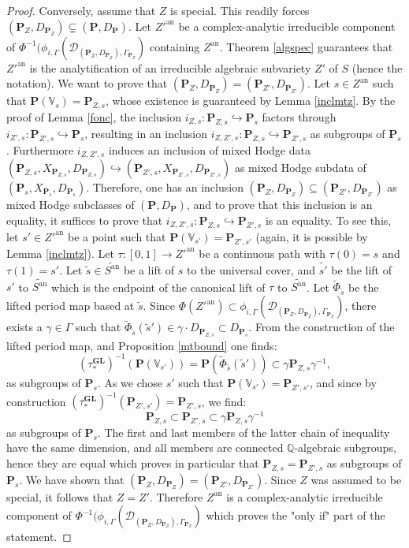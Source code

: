 \documentclass[10pt]{article}
\numberwithin{equation}{subsection}
\theoremstyle{plain}
\theoremstyle{definition}
\theoremstyle{remark}
\newcommand{\Q}{\mathbb Q}
\newcommand{\V}{\mathbb V}
\newcommand{\pp}{\mathbf P}
\newcommand{\an}{\mathrm{an}}
\newcommand{\gl}{\mathbf{GL}}
\newcommand{\period}{\mathscr{D}}
\begin{document}
\begin{proof}
Conversely, assume that $Z$ is special. This readily forces $(\pp_Z, D_{\pp_Z}) \subsetneq (\pp, D_\pp)$. Let $Z'^\an$ be a complex-analytic irreducible component of $\Phi^{-1}(\phi_{i, \Gamma}(\period_{(\pp_Z, D_{\pp_Z}), \Gamma_{\pp_Z}})$ containing $Z^\an$. Theorem \ref{algspec} guarantees that $Z'^\an$ is the analytification of an irreducible algebraic subvariety $Z'$ of $S$ (hence the notation). We want to prove that $(\pp_Z , D_{\pp_Z}) = (\pp_{Z'}, D_{\pp_{Z'}})$. Let $s \in Z^\an$ such that $\pp(\V_s) = \pp_{Z,s}$, whose existence is guaranteed by Lemma \ref{inclmtz}. By the proof of Lemma \ref{fonc}, the inclusion $i_{Z,s} : \pp_{Z,s} \hookrightarrow \pp_s$ factors through $i_{Z',s} : \pp_{Z',s} \hookrightarrow \pp_s$, resulting in an inclusion $i_{Z,Z',s} : \pp_{Z,s} \hookrightarrow \pp_{Z',s}$ as subgroups of $\pp_s$. Furthermore $i_{Z,Z',s}$ induces an inclusion of mixed Hodge data $(\pp_{Z,s}, X_{\pp_{Z,s}}, D_{\pp_{Z,s}}) \hookrightarrow (\pp_{Z',s}, X_{\pp_{Z',s}}, D_{\pp_{Z',s}})$ as mixed Hodge subdata of $(\pp_s, X_{\pp_s}, D_{\pp_s})$. Therefore, one has an inclusion $(\pp_Z, D_{\pp_Z}) \subseteq (\pp_{Z'}, D_{\pp_{Z'}})$ as mixed Hodge subclasses of $(\pp, D_\pp)$, and to prove that this inclusion is an equality, it suffices to prove that $i_{Z,Z',s} : \pp_{Z,s} \hookrightarrow \pp_{Z',s}$ is an equality. To see this, let $s' \in Z'^\an$ be a point such that $\pp(\V_{s'}) = \pp_{Z',s'}$ (again, it is possible by Lemma \ref{inclmtz}). Let $\tau : [0,1] \rightarrow Z'^\an$ be a continuous path with $\tau(0) = s$ and $\tau(1) = s'$. Let $\tilde{s} \in \widetilde{S^\an}$ be a lift of $s$ to the universal cover, and $\tilde{s'}$ be the lift of $s'$ to $\widetilde{S^\an}$ which is the endpoint of the canonical lift of $\tau$ to $\widetilde{S^\an}$. Let $\tilde{\Phi}_{\tilde{s}}$ be the lifted period map based at $\tilde{s}$. Since $\Phi(Z'^\an) \subset \phi_{i, \Gamma}(\period_{(\pp_Z, D_{\pp_Z}), \Gamma_{\pp_Z}})$, there exists a $\gamma \in \Gamma$ such that $\tilde{\Phi}_{\tilde{s}}(\tilde{s}') \in \gamma \cdot D_{\pp_{Z,s}} \subset D_{\pp_s}$. From the construction of the lifted period map, and Proposition \ref{mtbound} one finds:
\[
(\tau_\ast^\gl)^{-1}(\pp(\V_{s'})) = \pp(\tilde{\Phi}_{\tilde{s}}(\tilde{s}')) \subset \gamma \pp_{Z,s} \gamma^{-1},
\]
as subgroups of $\pp_s$. As we chose $s'$ such that $\pp(\V_{s'}) = \pp_{Z',s'}$, and since by construction $(\tau_\ast^\gl)^{-1}(\pp_{Z',s'}) = \pp_{Z',s}$, we find:
\[
\pp_{Z,s} \subset \pp_{Z',s} \subset \gamma \pp_{Z,s} \gamma^{-1}
\]
as subgroups of $\pp_s$. The first and last members of the latter chain of inequality have the same dimension, and all members are connected $\Q$-algebraic subgroups, hence they are equal which proves in particular that $\pp_{Z,s} = \pp_{Z',s}$ as subgroups of $\pp_s$. We have shown that $(\pp_Z , D_{\pp_Z}) = (\pp_{Z'}, D_{\pp_{Z'}})$. Since $Z$ was assumed to be special, it follows that $Z = Z'$. Therefore $Z^\an$ is a complex-analytic irreducible component of $\Phi^{-1}(\phi_{i, \Gamma}(\period_{(\pp_Z, D_{\pp_Z}), \Gamma_{\pp_Z}})$ which proves the "only if" part of the statement.
\end{proof}
\end{document}
